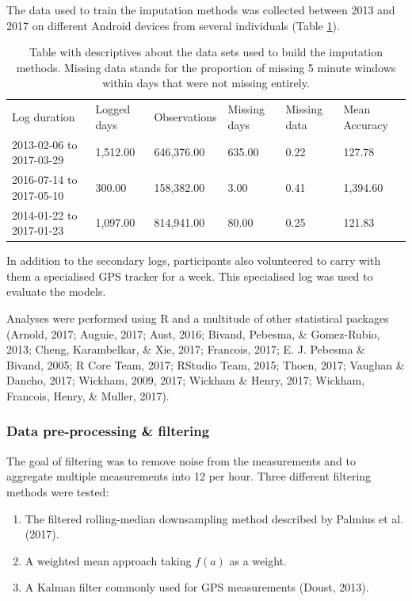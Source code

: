 \documentclass[english,man]{apa6}
\makeatletter
\newenvironment{lltable}
  {\begin{landscape}\begin{center}\begin{ThreePartTable}}
  {\end{ThreePartTable}\end{center}\end{landscape}}
\newcommand\LastLTentrywidth{1em}
\newlength\longtablewidth
\newcommand\getlongtablewidth{%
 \begingroup
  \ifcsname LT@\roman{LT@tables}\endcsname
  \global\longtablewidth=0pt
  \renewcommand\LT@entry[2]{\global\advance\longtablewidth by ##2\relax\gdef\LastLTentrywidth{##2}}%
  \@nameuse{LT@\roman{LT@tables}}%
  \fi
\endgroup}
\providecommand{\tightlist}{%
  \setlength{\itemsep}{0pt}\setlength{\parskip}{0pt}}
\theoremstyle{definition}
\theoremstyle{definition}
\theoremstyle{definition}
\theoremstyle{remark}
\makeatother
\begin{document}
The data used to train the imputation methods was collected between 2013
and 2017 on different Android devices from several individuals (Table
\ref{tab:datadetailsTable}).

\begin{lltable}
\begin{longtable}{llllll}\noalign{\getlongtablewidth\global\LTcapwidth=\longtablewidth}
\caption{\label{tab:datadetailsTable}Table with descriptives about the data sets used to build the imputation methods. Missing data stands for the proportion of missing 5 minute windows within days that were not missing entirely.}\\
\toprule
Log duration & Logged days & Observations & Missing
days & Missing
data & Mean Accuracy\\
\midrule
2013-02-06 to 2017-03-29 & 1,512.00 & 646,376.00 & 635.00 & 0.22 & 127.78\\
2016-07-14 to 2017-05-10 & 300.00 & 158,382.00 & 3.00 & 0.41 & 1,394.60\\
2014-01-22 to 2017-01-23 & 1,097.00 & 814,941.00 & 80.00 & 0.25 & 121.83\\
\bottomrule
\end{longtable}
\end{lltable}

In addition to the secondary logs, participants also volunteered to
carry with them a specialised GPS tracker for a week. This specialised
log was used to evaluate the models.

Analyses were performed using R and a multitude of other statistical
packages (Arnold, 2017; Auguie, 2017; Aust, 2016; Bivand, Pebesma, \&
Gomez-Rubio, 2013; Cheng, Karambelkar, \& Xie, 2017; Francois, 2017; E.
J. Pebesma \& Bivand, 2005; R Core Team, 2017; RStudio Team, 2015;
Thoen, 2017; Vaughan \& Dancho, 2017; Wickham, 2009, 2017; Wickham \&
Henry, 2017; Wickham, Francois, Henry, \& Muller, 2017).

\subsubsection{Data pre-processing \&
filtering}\label{data-pre-processing-filtering}

The goal of filtering was to remove noise from the measurements and to
aggregate multiple measurements into 12 per hour. Three different
filtering methods were tested:

\begin{enumerate}
\def\labelenumi{\arabic{enumi}.}
\tightlist
\item
  The filtered rolling-median downsampling method described by Palmius
  et al. (2017).
\item
  A weighted mean approach taking \(f(a)\) as a weight.
\item
  A Kalman filter commonly used for GPS measurements (Doust, 2013).
\end{enumerate}
\end{document}
